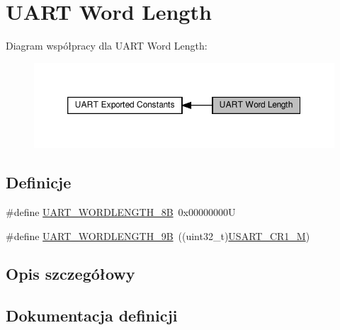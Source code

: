 \hypertarget{group___u_a_r_t___word___length}{}\section{U\+A\+RT Word Length}
\label{group___u_a_r_t___word___length}
Diagram współpracy dla U\+A\+RT Word Length\+:\nopagebreak
\begin{figure}[H]
\begin{center}
\leavevmode
\includegraphics[width=350pt]{group___u_a_r_t___word___length}
\end{center}
\end{figure}
\subsection*{Definicje}
\begin{DoxyCompactItemize}
\item 
\#define \hyperlink{group___u_a_r_t___word___length_gaf394e9abaf17932ee89591f990fe6407}{U\+A\+R\+T\+\_\+\+W\+O\+R\+D\+L\+E\+N\+G\+T\+H\+\_\+8B}~0x00000000U
\item 
\#define \hyperlink{group___u_a_r_t___word___length_gaf867be43de35fd3c32fe0b4dd4058f7e}{U\+A\+R\+T\+\_\+\+W\+O\+R\+D\+L\+E\+N\+G\+T\+H\+\_\+9B}~((uint32\+\_\+t)\hyperlink{group___peripheral___registers___bits___definition_ga95f0288b9c6aaeca7cb6550a2e6833e2}{U\+S\+A\+R\+T\+\_\+\+C\+R1\+\_\+M})
\end{DoxyCompactItemize}


\subsection{Opis szczegółowy}


\subsection{Dokumentacja definicji}
\mbox{\label{group___u_a_r_t___word___length_gaf394e9abaf17932ee89591f990fe6407}} 
